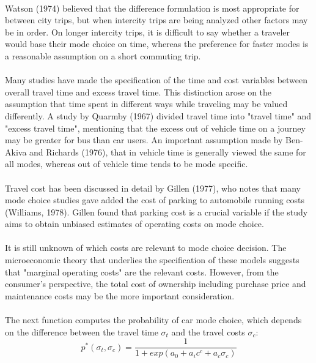 \paragraph{}Watson (1974) believed that the difference formulation is most appropriate for between city trips, but when intercity trips are being analyzed other factors may be in order. On longer intercity trips, it is difficult to say whether a traveler would base their mode choice on time, whereas the preference for faster modes is a reasonable assumption on a short commuting trip. 
\paragraph{}Many studies have made the specification of the time and cost variables between overall travel time and excess travel time. This distinction arose on the assumption that time spent in different ways while traveling may be valued differently. A study by Quarmby (1967) divided travel time into "travel time" and "excess travel time", mentioning that the excess out of vehicle time on a journey may be greater for bus than car users. An important assumption made by Ben-Akiva and Richards (1976), that in vehicle time is generally viewed the same for all modes, whereas out of vehicle time tends to be mode  specific. 
\paragraph{}Travel cost has been discussed in detail by Gillen (1977), who notes that many mode choice studies gave added the cost of parking to automobile running costs (Williams, 1978). Gillen found that parking cost is a  crucial variable if the study aims to obtain unbiased estimates of operating costs on mode choice. 
\paragraph{}It is still unknown of which costs are relevant to mode choice decision. The microeconomic theory that underlies the specification of these models suggests that "marginal operating costs" are the relevant costs. However, from the consumer's perspective, the total cost of ownership including purchase price and maintenance costs may be the more important consideration.  
\paragraph{}The next function computes the probability of car mode choice, which depends on the difference between the travel time $\sigma_t$ and the travel costs $\sigma_c$:
\begin{equation}
p^{*}(\sigma_t,\sigma_c) = \frac{1}{1+exp(a_0+ a_i c^c + a_c \sigma_c)}
\end{equation}
